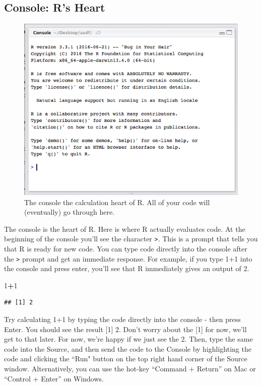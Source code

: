 \documentclass[
]{book}
\newenvironment{Shaded}{\begin{snugshade}}{\end{snugshade}}
\newcommand{\DecValTok}[1]{\textcolor[rgb]{0.00,0.00,0.81}{#1}}
\newcommand{\OperatorTok}[1]{\textcolor[rgb]{0.81,0.36,0.00}{\textbf{#1}}}
\begin{document}
\hypertarget{console-rs-heart}{%
\subsection{Console: R's Heart}\label{console-rs-heart}}

\begin{figure}
\includegraphics[width=0.75\linewidth]{images/consoless} \caption{The console the calculation heart of R. All of your code will (eventually) go through here.}\label{fig:consolewindow}
\end{figure}

The console is the heart of R. Here is where R actually evaluates code. At the beginning of the console you'll see the character \texttt{>}. This is a prompt that tells you that R is ready for new code. You can type code directly into the console after the \texttt{>} prompt and get an immediate response. For example, if you type 1+1 into the console and press enter, you'll see that R immediately gives an output of 2.

\begin{Shaded}
\begin{Highlighting}[]
\DecValTok{1}\OperatorTok{+}\DecValTok{1}
\end{Highlighting}
\end{Shaded}

\begin{verbatim}
## [1] 2
\end{verbatim}

Try calculating 1+1 by typing the code directly into the console - then press Enter. You should see the result {[}1{]} 2. Don't worry about the {[}1{]} for now, we'll get to that later. For now, we're happy if we just see the 2. Then, type the same code into the Source, and then send the code to the Console by highlighting the code and clicking the ``Run" button on the top right hand corner of the Source window. Alternatively, you can use the hot-key ``Command + Return'' on Mac or ``Control + Enter'' on Windows.
\end{document}
